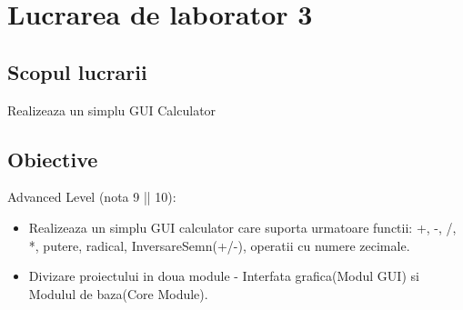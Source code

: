 \section{Lucrarea de laborator 3}

\subsection{Scopul lucrarii}

	Realizeaza un simplu GUI Calculator\
	
\subsection{Obiective}
Advanced Level (nota 9 || 10):
\begin{itemize}
		\item Realizeaza un simplu GUI calculator care suporta urmatoare functii: +, -, /, *, putere, radical, InversareSemn(+/-), operatii cu numere zecimale.
		\item Divizare proiectului in doua module - Interfata grafica(Modul GUI) si Modulul de baza(Core Module). 
\end{itemize}
	